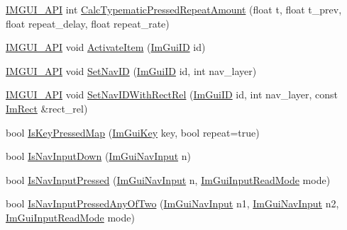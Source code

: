 \begin{DoxyCompactItemize}
\item 
\mbox{\hyperlink{imgui_8h_a43829975e84e45d1149597467a14bbf5}{I\+M\+G\+U\+I\+\_\+\+A\+PI}} int \mbox{\hyperlink{namespace_im_gui_ad3af0fc327467a44116d7d04018b9124}{Calc\+Typematic\+Pressed\+Repeat\+Amount}} (float t, float t\+\_\+prev, float repeat\+\_\+delay, float repeat\+\_\+rate)
\item 
\mbox{\hyperlink{imgui_8h_a43829975e84e45d1149597467a14bbf5}{I\+M\+G\+U\+I\+\_\+\+A\+PI}} void \mbox{\hyperlink{namespace_im_gui_ac56279417745ae5680a7ae5b00a2a60f}{Activate\+Item}} (\mbox{\hyperlink{imgui_8h_a1785c9b6f4e16406764a85f32582236f}{Im\+Gui\+ID}} id)
\item 
\mbox{\hyperlink{imgui_8h_a43829975e84e45d1149597467a14bbf5}{I\+M\+G\+U\+I\+\_\+\+A\+PI}} void \mbox{\hyperlink{namespace_im_gui_acb36abbe2ac25534eed9fc73f8c6adef}{Set\+Nav\+ID}} (\mbox{\hyperlink{imgui_8h_a1785c9b6f4e16406764a85f32582236f}{Im\+Gui\+ID}} id, int nav\+\_\+layer)
\item 
\mbox{\hyperlink{imgui_8h_a43829975e84e45d1149597467a14bbf5}{I\+M\+G\+U\+I\+\_\+\+A\+PI}} void \mbox{\hyperlink{namespace_im_gui_a91892871e19fba553a0f81e2cc49b0d3}{Set\+Nav\+I\+D\+With\+Rect\+Rel}} (\mbox{\hyperlink{imgui_8h_a1785c9b6f4e16406764a85f32582236f}{Im\+Gui\+ID}} id, int nav\+\_\+layer, const \mbox{\hyperlink{struct_im_rect}{Im\+Rect}} \&rect\+\_\+rel)
\item 
bool \mbox{\hyperlink{namespace_im_gui_aa4c4806c81aef3abe125b209f19d4a2b}{Is\+Key\+Pressed\+Map}} (\mbox{\hyperlink{imgui_8h_a1671ca739cf1384a8cc268758f27b4e7}{Im\+Gui\+Key}} key, bool repeat=true)
\item 
bool \mbox{\hyperlink{namespace_im_gui_a6e17ebbbba6b83702bb1059aee98e420}{Is\+Nav\+Input\+Down}} (\mbox{\hyperlink{imgui_8h_a8334d2b3901efd9820b64e2413967469}{Im\+Gui\+Nav\+Input}} n)
\item 
bool \mbox{\hyperlink{namespace_im_gui_a1ad1c0c31f7299147da51093baa1663e}{Is\+Nav\+Input\+Pressed}} (\mbox{\hyperlink{imgui_8h_a8334d2b3901efd9820b64e2413967469}{Im\+Gui\+Nav\+Input}} n, \mbox{\hyperlink{imgui__internal_8h_a595aad51728e2685daff714edb3d05fd}{Im\+Gui\+Input\+Read\+Mode}} mode)
\item 
bool \mbox{\hyperlink{namespace_im_gui_a9e235473624d8c3c1539add6df8bf032}{Is\+Nav\+Input\+Pressed\+Any\+Of\+Two}} (\mbox{\hyperlink{imgui_8h_a8334d2b3901efd9820b64e2413967469}{Im\+Gui\+Nav\+Input}} n1, \mbox{\hyperlink{imgui_8h_a8334d2b3901efd9820b64e2413967469}{Im\+Gui\+Nav\+Input}} n2, \mbox{\hyperlink{imgui__internal_8h_a595aad51728e2685daff714edb3d05fd}{Im\+Gui\+Input\+Read\+Mode}} mode)

\end{DoxyCompactItemize}
